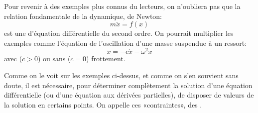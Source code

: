 \medskip
Pour revenir à des exemples plus connus du lecteurs, on n'oubliera pas que la relation fondamentale de la dynamique, de Newton: 
\begin{equation} m\ddot{x}=f(x)
\end{equation}
est une d'équation différentielle du second ordre.
On pourrait multiplier les exemples comme l'équation de l'oscillation d'une masse suspendue à un ressort:
\begin{equation}
\ddot{x} = - c \dot{x} - \omega^2x 
\end{equation}%
avec ($c>0$) ou sans ($c=0$) frottement.

\medskip
Comme on le voit sur les exemples ci-dessus, et comme on s'en souvient sans doute, il est nécessaire, pour déterminer complètement la solution d'une équation différentielle (ou d'une équation aux dérivées partielles), de disposer de valeurs de la solution en certains points. On appelle ces «contraintes», des .


